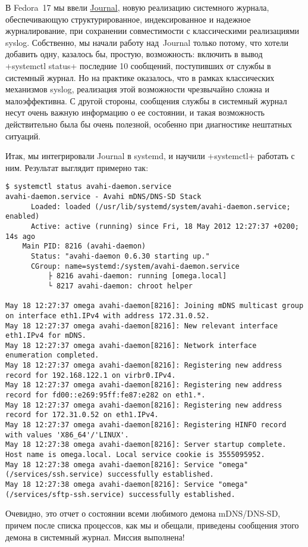 \documentclass[10pt,oneside,a4paper]{article}
\begin{document}
В Fedora~17 мы ввели
\href{http://0pointer.de/blog/projects/the-journal.html}{Journal}, новую
реализацию системного журнала, обеспечивающую структурированное, индексированное
и надежное журналирование, при сохранении совместимости с классическими
реализациями syslog. Собственно, мы начали работу над~Journal только потому, что
хотели добавить одну, казалось бы, простую, возможность: включить в вывод
+systemctl status+ последние 10 сообщений, поступивших от службы в системный
журнал. Но на практике оказалось, что в рамках классических механизмов syslog,
реализация этой возможности чрезвычайно сложна и малоэффективна. С другой
стороны, сообщения службы в системный журнал несут очень важную информацию о ее
состоянии, и такая возможность действительно была бы очень полезной, особенно
при диагностике нештатных ситуаций.

Итак, мы интегрировали Journal в systemd, и научили +systemctl+ работать с ним.
Результат выглядит примерно так:
\begin{Verbatim}[fontsize=\small]
$ systemctl status avahi-daemon.service
avahi-daemon.service - Avahi mDNS/DNS-SD Stack
	  Loaded: loaded (/usr/lib/systemd/system/avahi-daemon.service; enabled)
	  Active: active (running) since Fri, 18 May 2012 12:27:37 +0200; 14s ago
	Main PID: 8216 (avahi-daemon)
	  Status: "avahi-daemon 0.6.30 starting up."
	  CGroup: name=systemd:/system/avahi-daemon.service
		  ├ 8216 avahi-daemon: running [omega.local]
		  └ 8217 avahi-daemon: chroot helper

May 18 12:27:37 omega avahi-daemon[8216]: Joining mDNS multicast group on interface eth1.IPv4 with address 172.31.0.52.
May 18 12:27:37 omega avahi-daemon[8216]: New relevant interface eth1.IPv4 for mDNS.
May 18 12:27:37 omega avahi-daemon[8216]: Network interface enumeration completed.
May 18 12:27:37 omega avahi-daemon[8216]: Registering new address record for 192.168.122.1 on virbr0.IPv4.
May 18 12:27:37 omega avahi-daemon[8216]: Registering new address record for fd00::e269:95ff:fe87:e282 on eth1.*.
May 18 12:27:37 omega avahi-daemon[8216]: Registering new address record for 172.31.0.52 on eth1.IPv4.
May 18 12:27:37 omega avahi-daemon[8216]: Registering HINFO record with values 'X86_64'/'LINUX'.
May 18 12:27:38 omega avahi-daemon[8216]: Server startup complete. Host name is omega.local. Local service cookie is 3555095952.
May 18 12:27:38 omega avahi-daemon[8216]: Service "omega" (/services/ssh.service) successfully established.
May 18 12:27:38 omega avahi-daemon[8216]: Service "omega" (/services/sftp-ssh.service) successfully established.
\end{Verbatim}
Очевидно, это отчет о состоянии всеми любимого демона mDNS/DNS-SD, причем после
списка процессов, как мы и обещали, приведены сообщения этого демона в системный
журнал. Миссия выполнена!
\end{document}
